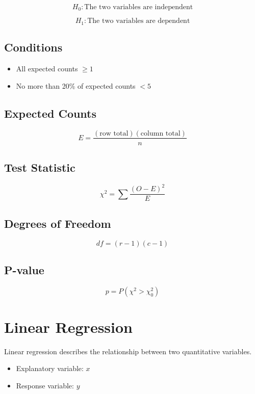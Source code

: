 \documentclass[11pt]{article}
\begin{document}
\[
H_0: \text{The two variables are independent}
\]

\[
H_1: \text{The two variables are dependent}
\]

\subsection*{Conditions}

\begin{itemize}
\item All expected counts $\ge 1$
\item No more than 20\% of expected counts $< 5$
\end{itemize}

\subsection*{Expected Counts}

\[
E = \frac{(\text{row total})(\text{column total})}{n}
\]

\subsection*{Test Statistic}

\[
\chi^2 =
\sum \frac{(O - E)^2}{E}
\]

\subsection*{Degrees of Freedom}

\[
df = (r-1)(c-1)
\]

\subsection*{P-value}

\[
p = P(\chi^2 > \chi_0^2)
\]

\section{Linear Regression}

Linear regression describes the relationship between two quantitative variables.

\begin{itemize}
\item Explanatory variable: $x$
\item Response variable: $y$
\end{itemize}
\end{document}
